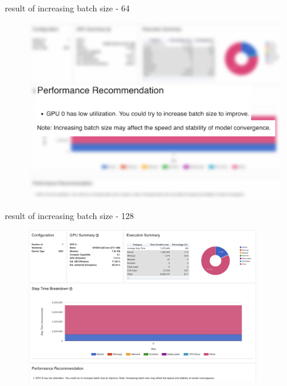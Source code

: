 \documentclass[compress,aspectratio=169]{beamer}
\begin{document}
\begin{frame}{result of increasing batch size - 64}
	\vspace{-1em}
\begin{center}
    \begin{figure}
        \includegraphics[width=1\textwidth]{../../data/scap_gtx1080_profiler-torch_batch-size-64_14650758_zoom}
    \end{figure}
    \end{center}

\end{frame}


\begin{frame}{result of increasing batch size - 128}
	\vspace{-1em}
\begin{center}
    \begin{figure}
        \includegraphics[width=0.9\textwidth]{../../data/scap_gtx1080_profiler-torch_batch-size-128_14650759}
    \end{figure}
    \end{center}

\end{frame}
\end{document}
